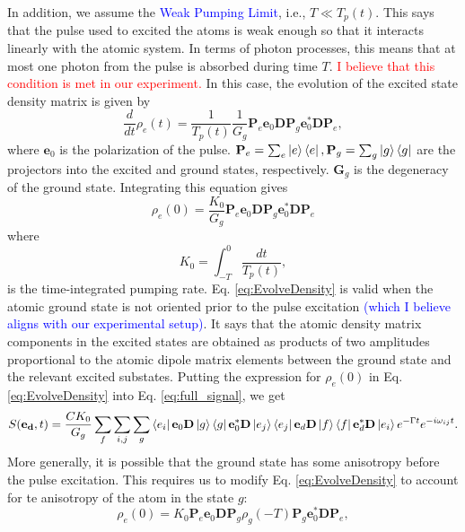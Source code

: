 \documentclass[11pt]{article}
\newcommand{\f}[2]{\frac{#1}{#2}}
\begin{document}
In addition, we assume the \textcolor{blue}{Weak Pumping Limit}, i.e., $T\ll T_p(t)$. This says that the pulse used to excited the atoms is weak enough so that it interacts linearly with the atomic system. In terms of photon processes, this means that at most one photon from the pulse is absorbed during time $T$. \textcolor{red}{I believe that this condition is met in our experiment.} In this case, the evolution of the excited state density matrix is given by
\begin{equation*}
\f{d}{dt} \rho_e(t) = \f{1}{T_p(t)} \f{1}{G_g} \mathbf{P}_e \mathbf{e}_0 \mathbf{D} \mathbf{P}_g \mathbf{e}_0^* \mathbf{D} \mathbf{P}_e,
\end{equation*}
where $\mathbf{e}_0$ is the polarization of the pulse. $\mathbf{P}_e = \sum_e \ket{e}\bra{e}, \mathbf{P}_g = \sum_g\ket{g}\bra{g}$ are the projectors into the excited and ground states, respectively. $\mathbf{G}_g$ is the degeneracy of the ground state. Integrating this equation gives
\begin{equation}\label{eq:EvolveDensity}
\rho_e(0) = \f{K_0}{G_g} \mathbf{P}_e \mathbf{e}_0 \mathbf{D} \mathbf{P}_g \mathbf{e}_0^* \mathbf{D} \mathbf{P}_e
\end{equation}
where
\begin{equation*}
K_0 = \int^0_{-T} \f{dt}{T_p(t)},
\end{equation*}
is the time-integrated pumping rate. Eq. \ref{eq:EvolveDensity} is valid when the atomic ground state is not oriented prior to the pulse excitation \textcolor{blue}{(which I believe aligns with our experimental setup)}. It says that the atomic density matrix components in the excited states are obtained as products of two amplitudes proportional to the atomic dipole matrix elements between the ground state and the relevant excited substates. Putting the expression for $\rho_e(0)$ in Eq. \ref{eq:EvolveDensity} into Eq. \ref{eq:full_signal}, we get
\begin{equation*}
S(\mathbf{e_d},t) = \f{CK_0}{G_g}\sum_f \sum_{i,j}\sum_g \bra{e_i} \mathbf{e}_0 \mathbf{D} \ket{g} \bra{g} \mathbf{e}_0^* \mathbf{D} \ket{e_j} \bra{e_j} \mathbf{e}_d \mathbf{D} \ket{f} \bra{f} \mathbf{e}_d^* \mathbf{D} \ket{e_i} e^{-\Gamma t}e^{-i\omega_{ij}t}.
\end{equation*}
More generally, it is possible that the ground state has some anisotropy before the pulse excitation. This requires us to modify Eq. \ref{eq:EvolveDensity} to account for te anisotropy of the atom in the state $g$:
\begin{equation}\label{eq:DensityEvolveModified}
\rho_e(0) = K_0 \mathbf{P}_e \mathbf{e}_0 \mathbf{D} \mathbf{P}_g \rho_g(-T) \mathbf{P}_g \mathbf{e}_0^* \mathbf{D} \mathbf{P}_e,
\end{equation}
\end{document}
